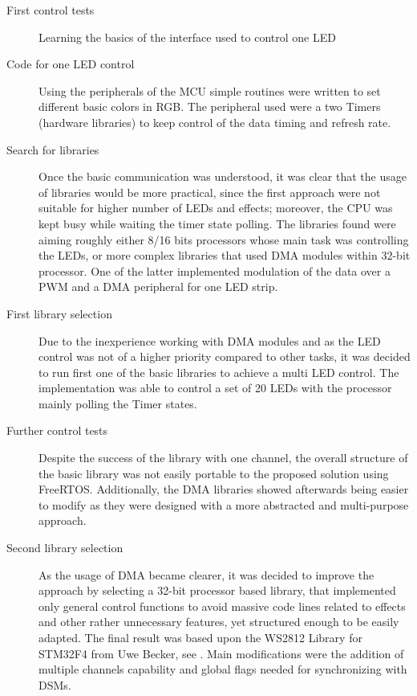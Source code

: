 \begin{description}
\item[First control tests] Learning the basics of the interface used to control one LED
\item[Code for one LED control] Using the peripherals of the MCU simple routines were written to set different basic colors in RGB. 
    The peripheral used were a two Timers (hardware libraries) to keep control of the data timing and refresh rate.
\item[Search for libraries] Once the basic communication was understood, it was clear that the usage of libraries would be more practical,
    since the first approach were not suitable for higher number of LEDs and effects; moreover, the CPU was kept busy while waiting 
    the timer state polling. The libraries found were aiming roughly either 8/16 bits processors whose main task was controlling the LEDs, 
    or more complex libraries that used DMA modules within 32-bit processor. One of the latter implemented modulation of the data over a PWM and a
    DMA peripheral for one LED strip.
\item[First library selection] Due to the inexperience working with DMA modules and as the LED control was not of a higher priority compared to other tasks, 
    it was decided to run first one of the basic libraries to achieve a multi LED control. The implementation was able to control a set of 20 LEDs
    with the processor mainly polling the Timer states.
\item[Further control tests] Despite the success of the library with one channel, the overall structure of the basic library
    was not easily portable to the proposed solution using FreeRTOS. Additionally, the DMA libraries showed afterwards being easier 
    to modify as they were designed with a more abstracted and multi-purpose approach.
\item[Second library selection] As the usage of DMA became clearer, it was decided to improve the approach by 
selecting a 32-bit processor based library, that implemented only general control functions to avoid massive code lines
related to effects and other rather unnecessary features, yet structured enough to be easily adapted. 
The final result was based upon the WS2812 Library for STM32F4 from Uwe Becker, see \cite{led_library}. 
Main modifications were the addition of multiple channels capability and global flags needed for synchronizing with DSMs.
\end{description}


